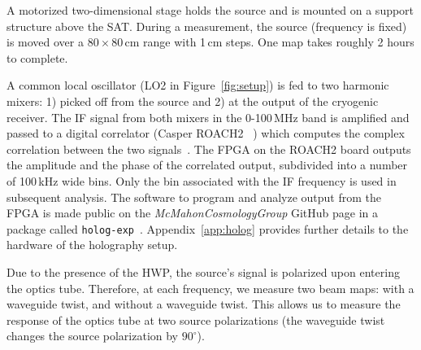 A motorized two-dimensional stage holds the source and is mounted on a support structure above the SAT.  During a measurement, the source (frequency is fixed) is moved over a $80\times80$\,cm range with 1\,cm steps.  One map takes roughly 2 hours to complete.

A common local oscillator (LO2 in Figure~\ref{fig:setup}) is fed to two harmonic mixers: 1) picked off from the source and 2) at the output of the cryogenic receiver.  The IF signal from both mixers in the 0-100\,MHz band is amplified and passed to a digital correlator (Casper ROACH2 ~\cite{roach2}) which computes the complex correlation between the two signals~\cite{ches18}.  The FPGA on the ROACH2 board outputs the amplitude and the phase of the correlated output, subdivided into a number of 100\,kHz wide bins.  Only the bin associated with the IF frequency is used in subsequent analysis.  The software to program and analyze output from the FPGA is made public on the \textit{McMahonCosmologyGroup} GitHub page in a package called \verb|holog-exp|~\cite{holog-exp}.  Appendix~\ref{app:holog} provides further details to the hardware of the holography setup.

Due to the presence of the HWP, the source's signal is polarized upon entering the optics tube.  Therefore, at each frequency, we measure two beam maps: with a waveguide twist, and without a waveguide twist.  This allows us to measure the response of the optics tube at two source polarizations (the waveguide twist changes the source polarization by $90^{\circ}$).

